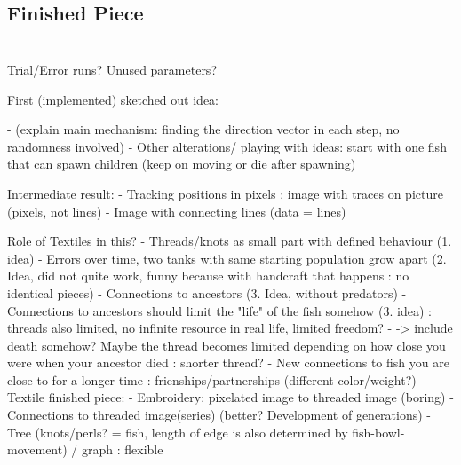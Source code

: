 \documentclass{scrartcl}
\begin{document}
\subsection{Finished Piece}

\section{}
\section{}
\subsection{}



Trial/Error runs? Unused parameters?

First (implemented) sketched out idea:

-	(explain main mechanism: finding the direction vector in each step, no randomness involved)
-	Other alterations/ playing with ideas: start with one fish that can spawn children (keep on moving or die after spawning)

Intermediate result:
-	Tracking positions in pixels : image with traces on picture (pixels, not lines)
-	Image with connecting lines (data = lines)

Role of Textiles in this?
-	Threads/knots as small part with defined behaviour (1. idea)
-	Errors over time, two tanks with same starting population grow apart (2. Idea, did not quite work, funny because with handcraft that happens : no identical pieces)
-	Connections to ancestors (3. Idea, without predators)
-	Connections to ancestors should limit the "life" of the  fish somehow (3. idea) : threads also limited, no infinite resource in real life, limited freedom?
-	-> include death somehow? Maybe the thread becomes limited depending on how close you were when your ancestor died : shorter thread?
-	New connections to fish you are close to for a longer time : frienships/partnerships (different color/weight?)
Textile finished piece:
-	Embroidery: pixelated image to threaded image (boring)
-	Connections to threaded image(series) (better? Development of generations)
-	Tree (knots/perls? = fish, length of edge is also determined by fish-bowl-movement) / graph : flexible
\end{document}
